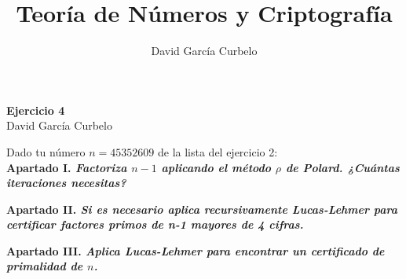 \documentclass[fleqn]{article}
\author{David García Curbelo}
\title{Teoría de Números y Criptografía}
\begin{document}
    \begin{center}
        \LARGE{\textbf{Ejercicio 4}} \\
        \Large{David García Curbelo} \\
    \end{center}

    \vspace{1cm}
    
    Dado tu número $n = 45352609$ de la lista del ejercicio 2: \\ 


    \textbf{Apartado I. \textit{Factoriza $n-1$ aplicando el método $\rho$ de Polard. ¿Cuántas iteraciones necesitas?}} 

    \newpage
    \textbf{Apartado II. \textit{Si es necesario aplica recursivamente Lucas-Lehmer para certificar factores primos de n-1 mayores de 4 cifras.}}


    \newpage
    \textbf{Apartado III. \textit{Aplica Lucas-Lehmer para encontrar un certificado de primalidad de $n$.}}
\end{document}
